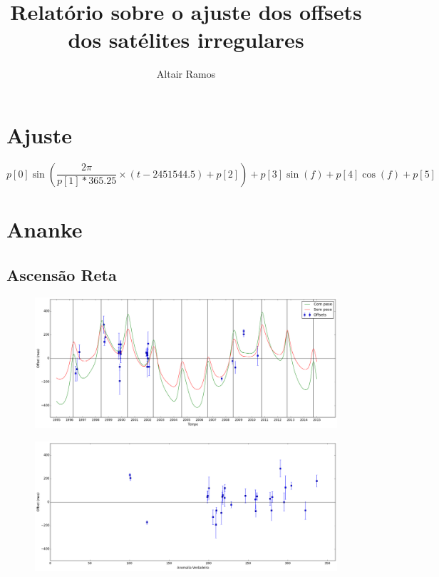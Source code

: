 \documentclass[11pt,a4paper]{report}
\title{Relatório sobre o ajuste dos offsets dos satélites irregulares}
\author{Altair Ramos}
\begin{document}
\chapter*{Ajuste}

\begin{equation}
p[0]\sin\left(\frac{2\pi}{p[1]*365.25}\times (t - 2451544.5) + p[2]\right) + p[3]\sin(f) + p[4]\cos(f) + p[5]
\end{equation}


\chapter*{Ananke}
\section*{Ascensão Reta}

\begin{figure}[h]
\includegraphics[scale=0.35]{Ananke/RA.png} 
\end{figure}

\begin{figure}[h]
\includegraphics[scale=0.35]{Ananke/RA_anom.png}  
\end{figure}
\end{document}
